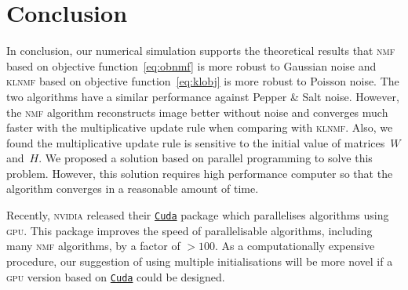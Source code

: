 \section{Conclusion}
In conclusion, our numerical simulation supports the theoretical results that \textsc{nmf} based on objective function~\eqref{eq:obnmf} is more robust to Gaussian noise and \textsc{klnmf} based on objective function~\eqref{eq:klobj} is more robust to Poisson noise. The two algorithms have a similar performance against Pepper \& Salt noise. However, the \textsc{nmf} algorithm reconstructs image better without noise and converges much faster with the multiplicative update rule when comparing with \textsc{klnmf}. Also, we found the multiplicative update rule is sensitive to the initial value of matrices~$W$ and~$H$. We proposed a solution based on parallel programming to solve this problem. However, this solution requires high performance computer so that the algorithm converges in a reasonable amount of time.

Recently, \textsc{nvidia} released their \href{https://developer.nvidia.com/cuda-zone}{\texttt{Cuda}} package which parallelises algorithms using \textsc{gpu}. This package improves the speed of parallelisable algorithms, including many \textsc{nmf} algorithms, by a factor of $>100$. As a computationally expensive procedure, our suggestion of using multiple initialisations will be more novel if a \textsc{gpu} version based on \href{https://developer.nvidia.com/cuda-zone}{\texttt{Cuda}} could be designed. 